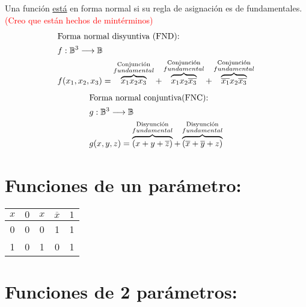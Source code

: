 \documentclass[../main.tex]{subfiles}
\begin{document}
Una función \underline{está} en forma normal  si su regla de asignación
es  de  fundamentales.
\textcolor{red}{(Creo que están hechos de mintérminos)}
\begin{align*}
	\intertext{Forma normal disyuntiva (FND):}
	&f:\mathbb{B}^3\longrightarrow\mathbb{B}\\
	&f(x_1,x_2,x_3)=\overbrace{x_1x_2x_3}^{\substack{\text{Conjunción}\\ fundamental}}
	+\overbrace{x_1x_2\overline{x_3}}^{\substack{\text{Conjunción}\\ fundamental}}
	+\overbrace{\overline{x_1}x_2\overline{x_3}}^{\substack{\text{Conjunción}\\ fundamental}}
\end{align*}
\begin{align*}
	\intertext{Forma normal conjuntiva(FNC):}
	&g:\mathbb{B}^3\longrightarrow\mathbb{B}\\
	&g(x,y,z)=\overbrace{(x+y+\overline{z})}^{\substack{\text{Disyunción}\\ fundamental}}
	+\overbrace{(\overline{x}+\overline{y}+z)}^{\substack{\text{Disyunción}\\ fundamental}}
\end{align*}
\section{Funciones de un parámetro:}%
\begin{center}
	\begin{tabular}{*{4}{c|}c}
		$x$ & $0$ & $x$ & $\overline{x}$ & $1$\\
		\hline
		0 & 0 & 0 & 1 & 1\\
		1 & 0 & 1 & 0 & 1\\
	\end{tabular}
\end{center}
\section{Funciones de 2 parámetros:}%
\end{document}
